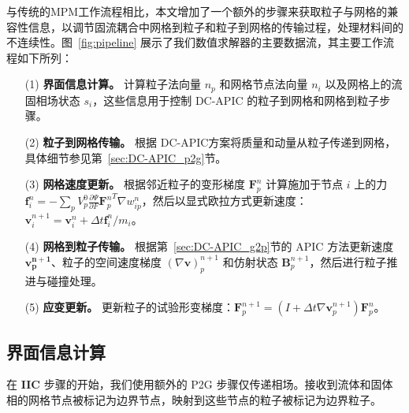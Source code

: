 与传统的MPM工作流程相比，本文增加了一个额外的步骤来获取粒子与网格的兼容性信息，以调节固流耦合中网格到粒子和粒子到网格的传输过程，处理材料间的不连续性。图~\ref{fig:pipeline} 展示了我们数值求解器的主要数据流，其主要工作流程如下所列：

\begin{enumerate}
\item[(1)] \textbf{界面信息计算。} 计算粒子法向量 $n_p$ 和网格节点法向量 $n_i$ 以及网格上的流固相场状态 $s_i$，这些信息用于控制 DC-APIC 的粒子到网格和网格到粒子步骤。
\item[(2)] \textbf{粒子到网格传输。} 根据 DC-APIC方案将质量和动量从粒子传递到网格，具体细节参见第~\ref{sec:DC-APIC_p2g}节。
\item[(3)] \textbf{网格速度更新。}
根据邻近粒子的变形梯度 $\mathbf{F}_p^n$ 计算施加于节点 $i$ 上的力 $\mathbf{f}_i^n=-\sum_p V_p^0 \frac{\partial \Psi}{\partial F} {\mathbf{F}_p^n}^T \nabla w_{ip}^n$，然后以显式欧拉方式更新速度：$\mathbf{v}_i^{n+1}=\mathbf{v}_i^n + \Delta t \mathbf{f}_i^n / m_i$。
\item[(4)] \textbf{网格到粒子传输。}
根据第~\ref{sec:DC-APIC_g2p}节的 APIC 方法更新速度 $\mathbf{v_p^{n+1}}$、粒子的空间速度梯度 $(\nabla \mathbf{v})_p^{n+1}$ 和仿射状态 $\mathbf{B}_p^{n+1}$，然后进行粒子推进与碰撞处理。
\item[(5)] \textbf{应变更新。}
更新粒子的试验形变梯度：$\mathbf{F}_p^{n+1} = (I + \Delta t \nabla \mathbf{v}_p^{n+1}) \mathbf{F}_p^n$。

\end{enumerate}



\subsection{界面信息计算}
\label{interface_information_calculation}
在 \textbf{IIC} 步骤的开始，我们使用额外的 P2G 步骤仅传递相场。接收到流体和固体相的网格节点被标记为边界节点，映射到这些节点的粒子被标记为边界粒子。

